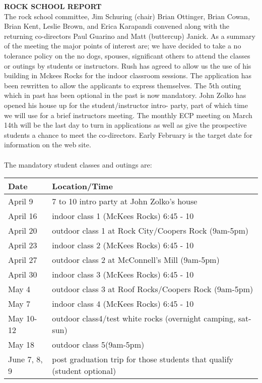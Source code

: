 \documentclass[10pt,a4paper]{article}
\begin{document}
\begin{multicols}{2}
\textbf{ROCK SCHOOL REPORT}\\
The rock school committee, Jim Schuring (chair) Brian Ottinger, Brian Cowan, Brian Kent, Leslie Brown, and Erica Karapandi convened along with the returning co-directors Paul Guarino and Matt (buttercup) Janick. As a summary of the meeting the major points of interest are; we have decided to take a no tolerance policy on the no dogs, spouses, significant others to attend the classes or outings by students or instructors. Rush has agreed to allow us the use of his building in Mckees Rocks for the indoor classroom sessions. The application has been rewritten to allow the applicants to express themselves. The 5th outing which in past has been optional in the past is now mandatory. John Zolko has opened his house up for the student/instructor intro- party, part of which time we will use for a brief instructors meeting. The monthly ECP meeting on March 14th will be the last day to turn in applications as well as give the prospective students a chance to meet the co-directors. Early February is the target date for information on the web site.
\\
\\
The mandatory student classes and outings are:\\
\begin{center}
    \begin{tabular}{ | l | p{6cm} | }
    \hline
    \textbf{Date} & \textbf{Location/Time} \\\hline
	April 9  &  	7 to 10 intro party at John Zolko's house\\
	April 16	 & indoor class 1 (McKees Rocks) 6:45 - 10\\
	April 20	 &	outdoor class 1 at Rock City/Coopers Rock (9am-5pm)\\
	April 23	 &	indoor class 2 (McKees Rocks) 6:45 - 10\\
	April 27 &		outdoor class 2 at McConnell's Mill (9am-5pm)\\
	April 30	 &	indoor class 3 (McKees Rocks) 6:45 - 10\\
	May 4 &		outdoor class 3 at Roof Rocks/Coopers Rock (9am-5pm)\\
	May 7 &		indoor class 4 (McKees Rocks) 6:45 - 10\\
	May 10-12 &	outdoor class4/test white rocks (overnight camping, sat-sun)\\
	May 18 &		outdoor class 5(9am-5pm)\\
	June 7, 8, 9 &	post graduation trip for those students that qualify (student optional)\\\hline
    \end{tabular}
\end{center}





\end{multicols}
\end{document}
